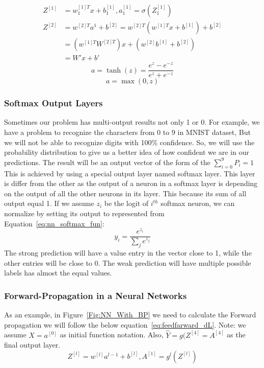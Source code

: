 \begin{subequations}\label{eq:linear_fun_limitations}
   \begin{align}
     Z^{[1]} & = w_1^{[1]T} x + b_1^{[1]} , a_1^{[1]} = \sigma(Z_1^{[1]}) \\
     Z^{[2]} & = w^{[2]T} a^1 + b^{[2]} = w^{[2]T} (w^{[1]T}x + b^{[1]}) + b^{[2]}\\
             & = (w^{[1]T}W^{[2]T})x + (w^{[2]}b^{[1]}+ b^{[2]})\\
             & = W' x + b'
\end{align}
\end{subequations}%
\begin{equation}\label{eq:nn_tanh}
  a = \tanh(z) =\frac{e^z-e^{-z}}{e^z+e^{-z}}
\end{equation}%
\begin{equation}\label{eq:nn_relu}
  a = \max(0,z)
\end{equation}%
\subsubsection{Softmax Output Layers}
Sometimes our problem has multi-output results not only 1 or 0. For example, we have a problem to recognize the characters from 0 to 9 in MNIST dataset, But we will not be able to recognize digits with 100\% confidence. So, we will use the probability distribution to give us a better idea of how confident we are in our predictions. The result will be an output vector of the form of the $\sum_{i = 0}^9P_i=1$
This is achieved by using a special output layer named softmax layer. This layer is differ from the other as the output of a neuron in a softmax layer is depending on the output of all the other neurons in its layer. This because its sum of all output equal 1. If we assume $z_i$ be the logit of $i^{th}$ softmax neuron, we can normalize by setting its output to represented from Equation~\eqref{eq:nn_softmax_fun}:%
\begin{equation}\label{eq:nn_softmax_fun}
  y_i=\frac{e^{z_i}}{\sum_je^{z_j}}
\end{equation}
The strong prediction will have a value entry in the vector close to 1, while the other entries will be close to 0. The weak prediction will have multiple possible labels has almost the equal values\cite{DLFundamentals}.
\subsubsection{Forward-Propagation in a Neural Networks}
As an example, in Figure~\ref{Fig:NN_With_BP} we need to calculate the Forward propagation we will follow the below equation~\eqref{eq:feedfarward_dL}. Note: we assume $X = a^{[0]}$ as initial function notation. Also, $\widehat{Y}= g(Z^{[4]}=A^{[4]}$ as the final output layer.%
\begin{equation}\label{eq:feedfarward_dL}
     Z^{[l]}  = w^{[l]} a^{l-1} + b^{[l]} , A^{[1]} = g^{l}(Z^{[l]})
   \end{equation} %

